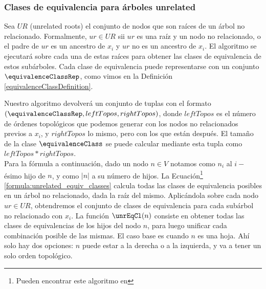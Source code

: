 
\subsubsection{Clases de equivalencia para árboles unrelated}

Sea $UR$ (unrelated roots) el conjunto de nodos que son raíces de un árbol no relacionado. Formalmente, $ur \in UR$ sii $ur$ es una raíz y un nodo no relacionado, o el padre de $ur$ es un ancestro de $x_i$ y $ur$ no es un ancestro de $x_i$. El algoritmo se ejecutará sobre cada una de estas raíces para obtener las clases de equivalencia de estos subárboles. Cada clase de equivalencia puede representarse con un conjunto $\equivalenceClassRep$, como vimos en la Definición \ref{equivalenceClassDefinition}. 



Nuestro algoritmo devolverá un conjunto de tuplas con el formato $(\equivalenceClassRep, leftTopos, rightTopos)$, donde $leftTopos$ es el número de órdenes topológicos que podemos generar con los nodos no relacionados previos a $x_i$, y $rightTopos$ lo mismo, pero con los que están después. El tamaño de la clase $\equivalenceClass$ se puede calcular mediante esta tupla como $leftTopos * rightTopos$.\\


Para la fórmula a continuación, dado un nodo $n \in V$ notamos como $n_i$ al $i-$ésimo hijo de $n$, y como $|n|$ a su número de hijos. La Ecuación\footnote{Pueden encontrar este algoritmo en } \ref{formula:unrelated_equiv_classes} calcula todas las clases de equivalencia posibles en un árbol no relacionado, dada la raíz del mismo. Aplicándola sobre cada nodo $ur \in UR$, obtendremos el conjunto de clases de equivalencia para cada subárbol no relacionado con $x_i$. La función $\unrEqCl(n)$ consiste en obtener todas las clases de equivalencias de los hijos del nodo $n$, para luego unificar cada combinación posible de las mismas. El caso base es cuando $n$ es una hoja. Ahí solo hay dos opciones: $n$ puede estar a la derecha o a la izquierda, y va a tener un solo orden topológico. 


